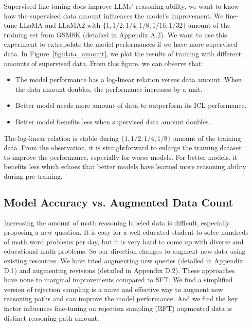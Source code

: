 Supervised fine-tuning does improve LLMs' reasoning ability, we want to know how the supervised data amount influences the model's improvement. We fine-tune LLaMA and LLaMA2 with $\{1,1/2,1/4,1/8,1/16,1/32\}$ amount of the training set from GSM8K (detailed in Appendix A.2). We want to use this experiment to extrapolate the model performances if we have more supervised data. In Figure~\ref{fig:data_amount}, we plot the results of training with different amounts of supervised data. From this figure, we can observe that:

\begin{itemize}
    \item The model performance has a log-linear relation versus data amount. When the data amount doubles, the performance increases by a unit.

    \item Better model needs more amount of data to outperform its ICL performance.
    \item Better model benefits less when supervised data amount doubles.
\end{itemize}

The log-linear relation is stable during $\{1,1/2,1/4,1/8\}$ amount of the training data. From the observation, it is straightforward to enlarge the training dataset to improve the performance, especially for worse models. For better models, it benefits less which echoes that better models have learned more reasoning ability during pre-training.

\subsection{Model Accuracy vs. Augmented Data Count} Increasing the amount of math reasoning labeled data is difficult, especially proposing a new question. It is easy for a well-educated student to solve hundreds of math word problems per day, but it is very hard to come up with diverse and educational math problems. So our direction changes to augment new data using existing resources. We have tried augmenting new queries (detailed in Appendix D.1) and augmenting revisions (detailed in Appendix D.2). These approaches have none to marginal improvements compared to SFT. We find a simplified version of rejection sampling \citep{zhu-etal-2023-solving} is a naive and effective way to augment new reasoning paths and can improve the model performance. And we find the key factor influences fine-tuning on rejection sampling (RFT) augmented data is distinct reasoning path amount.

